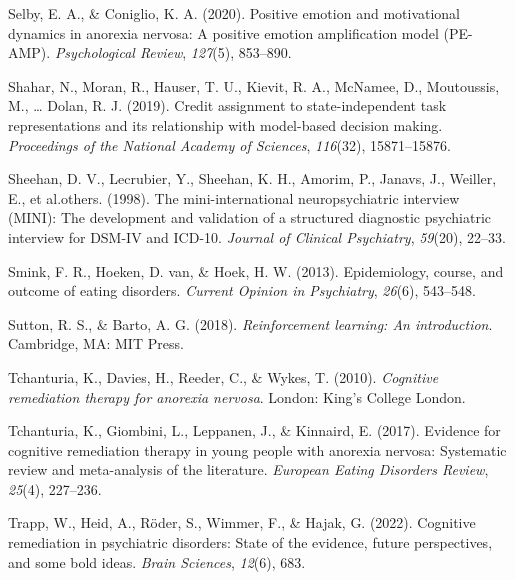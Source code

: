 \documentclass[
  man,floatsintext]{apa6}
\newlength{\cslhangindent}
\newlength{\cslentryspacingunit} %
\newenvironment{CSLReferences}[2] %
 {%
  \setlength{\parindent}{0pt}
  \ifodd #1
  \let\oldpar\par
  \def\par{\hangindent=\cslhangindent\oldpar}
  \fi
  \setlength{\parskip}{#2\cslentryspacingunit}
 }%
 {}
\begin{document}
\begin{CSLReferences}{1}{0}
\leavevmode{}%
Selby, E. A., \& Coniglio, K. A. (2020). Positive emotion and motivational dynamics in anorexia nervosa: A positive emotion amplification model (PE-AMP). \emph{Psychological Review}, \emph{127}(5), 853--890.

\leavevmode{}%
Shahar, N., Moran, R., Hauser, T. U., Kievit, R. A., McNamee, D., Moutoussis, M., \ldots{} Dolan, R. J. (2019). Credit assignment to state-independent task representations and its relationship with model-based decision making. \emph{Proceedings of the National Academy of Sciences}, \emph{116}(32), 15871--15876.

\leavevmode{}%
Sheehan, D. V., Lecrubier, Y., Sheehan, K. H., Amorim, P., Janavs, J., Weiller, E., et al.others. (1998). The mini-international neuropsychiatric interview (MINI): The development and validation of a structured diagnostic psychiatric interview for DSM-IV and ICD-10. \emph{Journal of Clinical Psychiatry}, \emph{59}(20), 22--33.

\leavevmode{}%
Smink, F. R., Hoeken, D. van, \& Hoek, H. W. (2013). Epidemiology, course, and outcome of eating disorders. \emph{Current Opinion in Psychiatry}, \emph{26}(6), 543--548.

\leavevmode{}%
Sutton, R. S., \& Barto, A. G. (2018). \emph{Reinforcement learning: An introduction}. Cambridge, MA: MIT Press.

\leavevmode{}%
Tchanturia, K., Davies, H., Reeder, C., \& Wykes, T. (2010). \emph{Cognitive remediation therapy for anorexia nervosa}. London: King's College London.

\leavevmode{}%
Tchanturia, K., Giombini, L., Leppanen, J., \& Kinnaird, E. (2017). Evidence for cognitive remediation therapy in young people with anorexia nervosa: Systematic review and meta-analysis of the literature. \emph{European Eating Disorders Review}, \emph{25}(4), 227--236.

\leavevmode{}%
Trapp, W., Heid, A., Röder, S., Wimmer, F., \& Hajak, G. (2022). Cognitive remediation in psychiatric disorders: State of the evidence, future perspectives, and some bold ideas. \emph{Brain Sciences}, \emph{12}(6), 683.


\end{CSLReferences}
\end{document}
